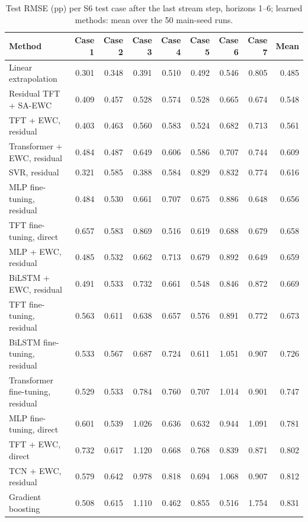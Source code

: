 \begin{table}[t]
  \centering
  \caption{Test RMSE (pp) per S6 test case after the last stream step, horizons 1--6; learned methods: mean over the 50 main-seed runs.}
  \label{tab:d24-per-group-e2}
  \setlength{\tabcolsep}{3pt}
  \scriptsize
  \begin{tabular}{lrrrrrrrr}
    \toprule
    Method & Case 1 & Case 2 & Case 3 & Case 4 & Case 5 & Case 6 & Case 7 & Mean \\
    \midrule
    Linear extrapolation & 0.301 & 0.348 & 0.391 & 0.510 & 0.492 & 0.546 & 0.805 & 0.485 \\
    Residual TFT + SA-EWC & 0.409 & 0.457 & 0.528 & 0.574 & 0.528 & 0.665 & 0.674 & 0.548 \\
    TFT + EWC, residual & 0.403 & 0.463 & 0.560 & 0.583 & 0.524 & 0.682 & 0.713 & 0.561 \\
    Transformer + EWC, residual & 0.484 & 0.487 & 0.649 & 0.606 & 0.586 & 0.707 & 0.744 & 0.609 \\
    SVR, residual & 0.321 & 0.585 & 0.388 & 0.584 & 0.829 & 0.832 & 0.774 & 0.616 \\
    MLP fine-tuning, residual & 0.484 & 0.530 & 0.661 & 0.707 & 0.675 & 0.886 & 0.648 & 0.656 \\
    TFT fine-tuning, direct & 0.657 & 0.583 & 0.869 & 0.516 & 0.619 & 0.688 & 0.679 & 0.658 \\
    MLP + EWC, residual & 0.485 & 0.532 & 0.662 & 0.713 & 0.679 & 0.892 & 0.649 & 0.659 \\
    BiLSTM + EWC, residual & 0.491 & 0.533 & 0.732 & 0.661 & 0.548 & 0.846 & 0.872 & 0.669 \\
    TFT fine-tuning, residual & 0.563 & 0.611 & 0.638 & 0.657 & 0.576 & 0.891 & 0.772 & 0.673 \\
    BiLSTM fine-tuning, residual & 0.533 & 0.567 & 0.687 & 0.724 & 0.611 & 1.051 & 0.907 & 0.726 \\
    Transformer fine-tuning, residual & 0.529 & 0.533 & 0.784 & 0.760 & 0.707 & 1.014 & 0.901 & 0.747 \\
    MLP fine-tuning, direct & 0.601 & 0.539 & 1.026 & 0.636 & 0.632 & 0.944 & 1.091 & 0.781 \\
    TFT + EWC, direct & 0.732 & 0.617 & 1.120 & 0.668 & 0.768 & 0.839 & 0.871 & 0.802 \\
    TCN + EWC, residual & 0.579 & 0.642 & 0.978 & 0.818 & 0.694 & 1.068 & 0.907 & 0.812 \\
    Gradient boosting & 0.508 & 0.615 & 1.110 & 0.462 & 0.855 & 0.516 & 1.754 & 0.831 \\

\end{tabular}
\end{table}
